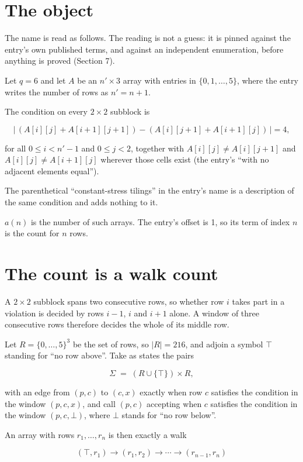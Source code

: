 \documentclass[11pt]{article}
\theoremstyle{definition}
\begin{document}
\section{The object}

The name is read as follows. The reading is not a guess: it is pinned against the entry's own published terms, and against an independent enumeration, before anything is proved (Section 7).

Let $q = 6$ and let $A$ be an $n' \times 3$ array with entries in $\{0,1,\dots,5\}$, where the entry writes the number of rows as $n' = n + 1$.

The condition on every $2 \times 2$ subblock is

\[\bigl|\,(A[i][j] + A[i{+}1][j{+}1]) - (A[i][j{+}1] + A[i{+}1][j])\,\bigr| = 4,\]

for all $0 \le i < n'-1$ and $0 \le j < 2$, together with $A[i][j] \ne A[i][j{+}1]$ and $A[i][j] \ne A[i{+}1][j]$ wherever those cells exist (the entry's ``with no adjacent elements equal'').

The parenthetical ``constant-stress tilings'' in the entry's name is a description of the same condition and adds nothing to it.

$a(n)$ is the number of such arrays. The entry's offset is 1, so its term of index $n$ is the count for $n$ rows.

\section{The count is a walk count}

A $2 \times 2$ subblock spans two consecutive rows, so whether row $i$ takes part in a violation is decided by rows $i-1$, $i$ and $i+1$ alone. A window of three consecutive rows therefore decides the whole of its middle row.

Let $R = \{0,\dots,5\}^{3}$ be the set of rows, so $|R| = 216$, and adjoin a symbol $\top$ standing for ``no row above''. Take as states the pairs

\[\Sigma \;=\; (R \cup \{\top\}) \times R,\]

with an edge from $(p,c)$ to $(c,x)$ exactly when row $c$ satisfies the condition in the window $(p,c,x)$, and call $(p,c)$ accepting when $c$ satisfies the condition in the window $(p,c,\bot)$, where $\bot$ stands for ``no row below''.

An array with rows $r_1,\dots,r_n$ is then exactly a walk

\[(\top,r_1) \to (r_1,r_2) \to \cdots \to (r_{n-1},r_n)\]
\end{document}
